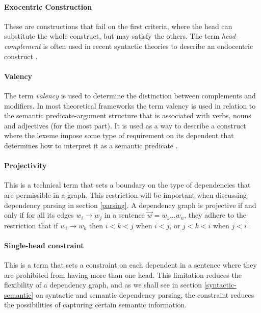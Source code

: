 \paragraph{Exocentric Construction} These are constructions that fail on the first criteria, where the head can substitute the whole construct, but may satisfy the others. The term \textit{head-complement} is often used in recent syntactic theories to describe an endocentric construct \cite{Niv:05}.

\paragraph{Valency} The term \textit{valency} is used to determine the distinction between complements and modifiers. In most theoretical frameworks the term valency is used in relation to the semantic predicate-argument structure that is associated with verbs, nouns and adjectives (for the most part). It is used as a way to describe a construct where the lexeme impose some type of requirement on its dependent that determines how to interpret it as a semantic predicate \cite{Niv:05}.

\paragraph{Projectivity} This is a technical term that sets a boundary on the type of dependencies that are permissible in a graph. This restriction will be important when discussing dependency parsing in section \ref{parsing}. A dependency graph is projective if and only if for all its edges $w_i \rightarrow w_j$ in a sentence $\vec{w} = w_1 ... w_n$, they adhere to the restriction that if $w_i \rightarrow w_k$ then $i < k < j$ when $i < j$, or $j < k < i$ when $j < i$ \cite{KublerEtAl:09}.

\paragraph{Single-head constraint} This is a term that sets a constraint on each dependent in a sentence where they are prohibited from having more than one head. This limitation reduces the flexibility of a dependency graph, and as we shall see in section \ref{syntactic-semantic} on syntactic and semantic dependency parsing, the constraint reduces the possibilities of capturing certain semantic information.\\

